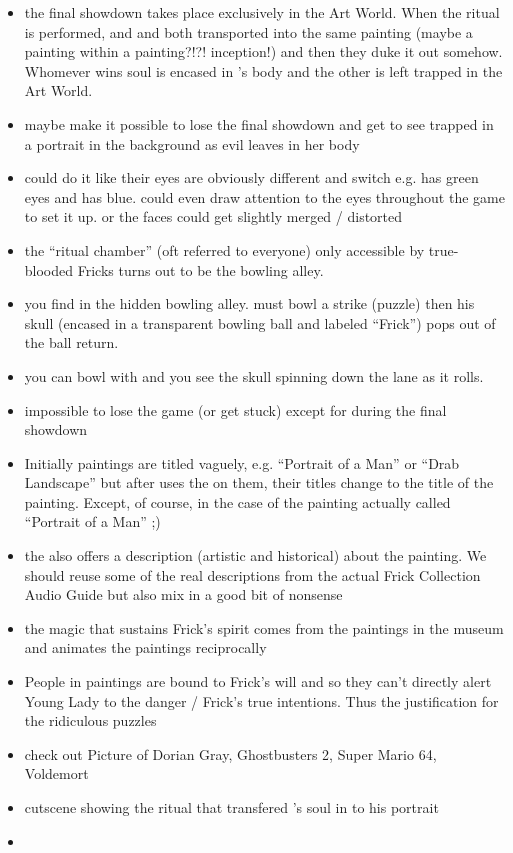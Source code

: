 \documentclass{article}
\begin{document}
\begin{itemize}
\begin{itemize}
    \end{itemize}
  \item the final showdown takes place exclusively in the Art World. When the ritual is performed, \cyl{} and \cfrick{} and both transported into the same painting (maybe a painting within a painting?!?! inception!) and then they duke it out somehow. Whomever wins soul is encased in \cyl{}'s body and the other is left trapped in the Art World.
  \item maybe make it possible to lose the final showdown and get to see \cyl{} trapped in a portrait in the background as evil \cfrick{} leaves in her body
  \item could do it like their eyes are obviously different and switch e.g. \cfrick{} has green eyes and \cyl{} has blue. could even draw attention to the eyes throughout the game to set it up. or the faces could get slightly merged / distorted
  \item the ``ritual chamber'' (oft referred to everyone) only accessible by true-blooded Fricks turns out to be the bowling alley.
  \item you find \ifrickskull{} in the hidden bowling alley. \cyl{} must bowl a strike (puzzle) then his skull (encased in a transparent bowling ball and labeled ``Frick'') pops out of the ball return.
  \item you can bowl with \ifrickskull{} and you see the skull spinning down the lane as it rolls.
  \item impossible to lose the game (or get stuck) except for during the final showdown
  \item Initially paintings are titled vaguely, e.g. ``Portrait of a Man'' or ``Drab Landscape'' but after \cyl{} uses the \iaudioguide{} on them, their titles change to the title of the painting. Except, of course, in the case of the painting actually called ``Portrait of a Man'' ;)
  \item the \iaudioguide also offers a description (artistic and historical) about the painting. We should reuse some of the real descriptions from the actual Frick Collection Audio Guide but also mix in a good bit of nonsense
  \item the magic that sustains Frick’s spirit comes from the paintings in the museum and animates the paintings reciprocally
  \item People in paintings are bound to Frick’s will and so they can’t directly alert Young Lady to the danger / Frick’s true intentions. Thus the justification for the ridiculous puzzles
  \item check out Picture of Dorian Gray, Ghostbusters 2, Super Mario 64, Voldemort
  \item cutscene showing the ritual that transfered \cfrick{}'s soul in to his portrait
  \item \cyl{}
\end{itemize}
\end{document}
